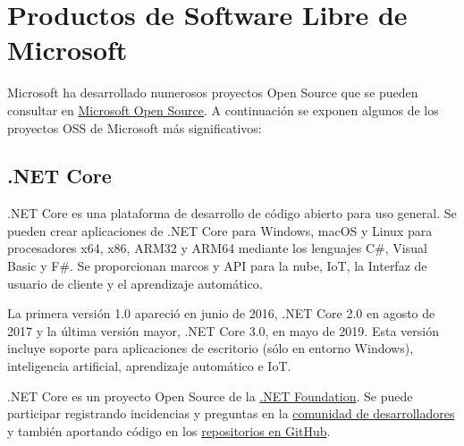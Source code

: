 \section{Productos de Software Libre de Microsoft}Microsoft ha desarrollado numerosos proyectos Open Source que se pueden consultar en \href{https://opensource.microsoft.com}{Microsoft Open Source}. A continuación se exponen algunos de los proyectos OSS de Microsoft más significativos:

\subsection{.NET Core}
.NET Core es una plataforma de desarrollo de código abierto para uso general. Se pueden crear aplicaciones de .NET Core para Windows, macOS y Linux para procesadores x64, x86, ARM32 y ARM64 mediante los lenguajes C\#, Visual Basic y F\#. Se proporcionan marcos y API para la nube, IoT, la Interfaz de usuario de cliente y el aprendizaje automático.

La primera versión 1.0 apareció en junio de 2016, .NET Core 2.0 en agosto de 2017 y la última versión mayor, .NET Core 3.0, en mayo de 2019. Esta versión incluye soporte para aplicaciones de escritorio (sólo en entorno Windows), inteligencia artificial, aprendizaje automático e IoT.

.NET Core es un proyecto Open Source de la \href{https://dotnetfoundation.org/}{.NET Foundation}. Se puede participar registrando incidencias y preguntas en la \href{https://developercommunity.visualstudio.com/spaces/61/index.html}{comunidad de desarrolladores} y también aportando código en los \href{https://github.com/dotnet/core/blob/master/Documentation/core-repos.md}{repositorios en GitHub}.

